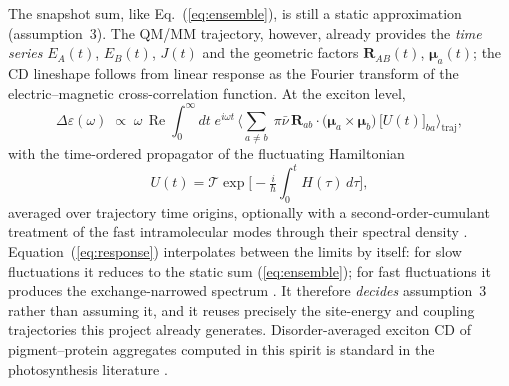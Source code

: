 \documentclass[11pt,a4paper]{article}
\newcommand{\muv}{\bm{\mu}}
\newcommand{\Rv}{\mathbf{R}}
\begin{document}
The snapshot sum, like Eq.~(\ref{eq:ensemble}), is still a static
approximation (assumption~3). The QM/MM trajectory, however, already provides
the \emph{time series} $E_{A}(t)$, $E_{B}(t)$, $J(t)$ and the geometric
factors $\Rv_{AB}(t)$, $\muv_{a}(t)$; the CD lineshape follows from linear
response as the Fourier transform of the electric--magnetic cross-correlation
function. At the exciton level,
\begin{equation}
\Delta\varepsilon(\omega)\;\propto\;\omega\,
\operatorname{Re}\!\int_{0}^{\infty}\!dt\;e^{i\omega t}\,
\Big\langle{\textstyle\sum_{a\neq b}}\;
\pi\bar\nu\,\Rv_{ab}\cdot\big(\muv_{a}\times\muv_{b}\big)\,
\big[U(t)\big]_{ba}\Big\rangle_{\mathrm{traj}},
\label{eq:response}
\end{equation}
with the time-ordered propagator of the fluctuating Hamiltonian
\begin{equation}
U(t)=\mathcal{T}\exp\!\Big[-\tfrac{i}{\hbar}\!\int_{0}^{t}\!H(\tau)\,d\tau\Big],
\end{equation}
averaged over trajectory time origins, optionally with a second-order-cumulant
treatment of the fast intramolecular modes through their spectral density
\cite{renger2002,zuehlsdorff2019}. Equation~(\ref{eq:response}) interpolates
between the limits by itself: for slow fluctuations it reduces to the static
sum (\ref{eq:ensemble}); for fast fluctuations it produces the exchange-narrowed
spectrum \cite{knapp1984}. It therefore \emph{decides} assumption~3 rather
than assuming it, and it reuses precisely the site-energy and coupling
trajectories this project already generates. Disorder-averaged exciton CD of
pigment--protein aggregates computed in this spirit is standard in the
photosynthesis literature \cite{somsen1996,vanamerongen2000,renger2002}.
\end{document}
